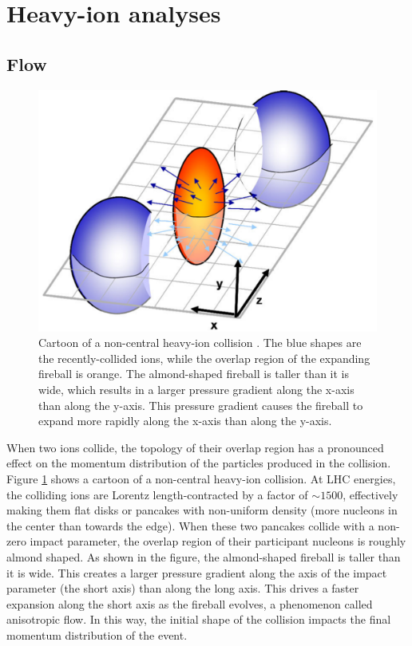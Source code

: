 \section{Heavy-ion analyses}

\subsection{Flow}
\label{sec:Flow}

\begin{figure}[hbt]
\includegraphics[width=36pc]{Figures/BorrowedFigures/Almond.pdf}
\caption[Non-central collision]{ 
Cartoon of a non-central heavy-ion collision \cite{Rapp:2008qc}.
The blue shapes are the recently-collided ions, while the overlap region of the expanding fireball is orange.
The almond-shaped fireball is taller than it is wide, which results in a larger pressure gradient along the x-axis than along the y-axis.
This pressure gradient causes the fireball to expand more rapidly along the x-axis than along the y-axis.
}
\label{fig:Almond}
\end{figure}
When two ions collide, the topology of their overlap region has a pronounced effect on the momentum distribution of the particles produced in the collision.
Figure \ref{fig:Almond} shows a cartoon of a non-central heavy-ion collision.
At LHC energies, the colliding ions are Lorentz length-contracted by a factor of $\sim 1500$, effectively making them flat disks or pancakes with non-uniform density (more nucleons in the center than towards the edge).
When these two pancakes collide with a non-zero impact parameter, the overlap region of their participant nucleons is roughly almond shaped.
As shown in the figure, the almond-shaped fireball is taller than it is wide.
This creates a larger pressure gradient along the axis of the impact parameter (the short axis) than along the long axis.
This drives a faster expansion along the short axis as the fireball evolves, a phenomenon called anisotropic flow.
In this way, the initial shape of the collision impacts the final momentum distribution of the event.

